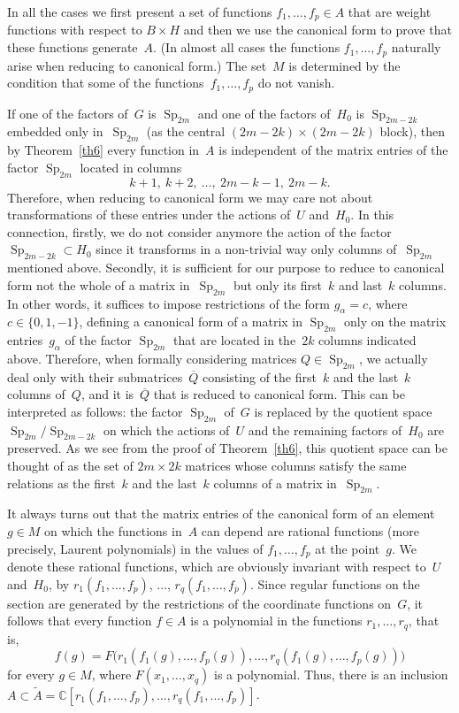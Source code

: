 \documentclass[12pt]{amsart}
\theoremstyle{definition}
\theoremstyle{remark}
\begin{document}
In all the cases we first present a set of functions
$f_1,\dots,f_p\in A$ that are weight functions with respect to
$B\times H$ and then we use the canonical form to prove that these
functions generate~$A$. (In almost all cases the functions
$f_1,\dots,f_p$ naturally arise when reducing to canonical form.)
The set~$M$ is determined by the condition that some of the
functions~$f_1,\dots,f_p$ do not vanish.

If one of the factors of~$G$ is ${\operatorname{Sp}}_{2m}$ and one of the factors
of~$H_0$ is ${\operatorname{Sp}}_{2m-2k}$ embedded only in~${\operatorname{Sp}}_{2m}$ (as the
central $(2m-2k)\times(2m-2k)$ block), then by Theorem~\ref{th6}
every function in~$A$ is independent of the matrix entries of the
factor ${\operatorname{Sp}}_{2m}$ located in columns
$$
k+1,\ k+2,\ \dots,\ 2m-k-1,\ 2m-k.
$$
Therefore, when reducing to canonical form we may care not about
transformations of these entries under the actions of~$U$ and~$H_0$.
In this connection, firstly, we do not consider anymore the action
of the factor ${\operatorname{Sp}}_{2m-2k}\subset H_0$ since it transforms in a
non-trivial way only columns of~${\operatorname{Sp}}_{2m}$ mentioned above.
Secondly, it is sufficient for our purpose to reduce to canonical
form not the whole of a matrix in~${\operatorname{Sp}}_{2m}$ but only its first~$k$
and last~$k$ columns. In other words, it suffices to impose
restrictions of the form $g_\alpha=c$, where $c\in\{0,1,-1\}$,
defining a canonical form of a matrix in ${\operatorname{Sp}}_{2m}$ only on the
matrix entries~$g_\alpha$ of the factor ${\operatorname{Sp}}_{2m}$ that are located
in the~$2k$ columns indicated above. Therefore, when formally
considering matrices $Q\in{\operatorname{Sp}}_{2m}$, we actually deal only with
their submatrices~$\overline Q$ consisting of the first~$k$ and the
last~$k$ columns of~$Q$, and it is~$\overline Q$ that is reduced to
canonical form. This can be interpreted as follows: the factor
${\operatorname{Sp}}_{2m}$ of~$G$ is replaced by the quotient space
${\operatorname{Sp}}_{2m}/{\operatorname{Sp}}_{2m-2k}$ on which the actions of~$U$ and the
remaining factors of~$H_0$ are preserved. As we see from the proof
of Theorem~\ref{th6}, this quotient space can be thought of as the
set of $2m\times 2k$ matrices whose columns satisfy the same
relations as the first~$k$ and the last~$k$ columns of a matrix
in~${\operatorname{Sp}}_{2m}$.

It always turns out that the matrix entries of the canonical form of
an element $g\in M$ on which the functions in~$A$ can depend are
rational functions (more precisely, Laurent polynomials) in the
values of $f_1,\dots,f_p$ at the point~$g$. We denote these rational
functions, which are obviously invariant with respect to~$U$
and~$H_0$, by $r_1(f_1,\dots,f_p)$, $\dots$, $r_q(f_1,\dots,f_p)$.
Since regular functions on the section are generated by the
restrictions of the coordinate functions on~$G$, it follows that
every function $f\in A$ is a polynomial in the functions
$r_1,\dots,r_q$, that is,
$$
f(g)=F\bigl(r_1(f_1(g),\dots,f_p(g)),\dots,
r_q(f_1(g),\dots,f_p(g))\bigr)
$$
for every $g\in M$, where $F(x_1,\dots,x_q)$ is a polynomial. Thus,
there is an inclusion $A \subset \tilde A=
\mathbb{C}[r_1(f_1,\dots,f_p),\dots,r_q(f_1,\dots,f_p)]$.
\end{document}
